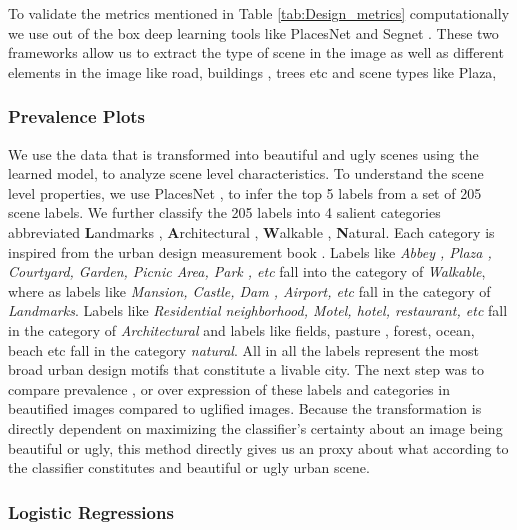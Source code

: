 To validate the metrics mentioned in Table \ref{tab:Design_metrics} computationally we use out of the box deep learning tools like PlacesNet \cite{zhou2014learning} and Segnet \cite{badrinarayanan2015segnet}. 
These two frameworks allow us to extract the type of scene in the image as well as different elements in the image like road, buildings , trees etc and scene types like Plaza, 
\subsubsection{Prevalence Plots}
We use the data that is transformed into beautiful and ugly scenes using the learned model, to analyze scene level characteristics. To understand the scene level properties, we use PlacesNet \cite{zhou2014learning} , to infer the top 5 labels from a set of 205 scene labels. We further classify the 205 labels into 4 salient categories abbreviated \textbf{L}andmarks , \textbf{A}rchitectural , \textbf{W}alkable , \textbf{N}atural. Each category is inspired from the urban design measurement book \cite{urbanDesign}.  Labels like \textit{Abbey , Plaza , Courtyard, Garden, Picnic Area, Park , etc} fall into the category of \textit{Walkable}, where as labels like \textit{Mansion, Castle, Dam , Airport, etc} fall in the category of \textit{Landmarks}. Labels like \textit{Residential neighborhood, Motel, hotel, restaurant, etc} fall in the category of \textit{Architectural} and labels like {fields, pasture , forest, ocean, beach etc } fall in the category \textit{natural}. All in all the labels represent the most broad urban design motifs that constitute a livable city. 
The next step was to compare prevalence , or over expression of these labels and categories in beautified images compared to uglified images. Because the transformation is directly dependent on maximizing the classifier's certainty about an image being beautiful or ugly, this method directly gives us an proxy about what according to the classifier constitutes and beautiful or ugly urban scene.


\subsubsection{Logistic Regressions}

